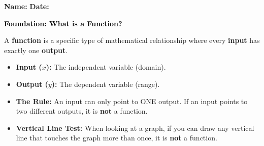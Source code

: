 \documentclass[12pt, letterpaper, fleqn]{article}
\begin{document}
\textbf{Name:} \underline{\hspace{5cm}}
\hfill
\textbf{Date:} \underline{\hspace{3cm}}\\

\begin{tcolorbox}[colback=customteal!20]
    \large\textcolor{black}{\textbf{Foundation: What is a Function?}}
\end{tcolorbox}

\vspace{3mm}

\noindent
A \textbf{function} is a specific type of mathematical relationship where every \textbf{input} has exactly one \textbf{output}. 

\begin{itemize}
    \item \textbf{Input ($x$):} The independent variable (domain).
    \item \textbf{Output ($y$):} The dependent variable (range).
    \item \textbf{The Rule:} An input can only point to ONE output. If an input points to two different outputs, it is \textbf{not} a function.
    \item \textbf{Vertical Line Test:} When looking at a graph, if you can draw any vertical line that touches the graph more than once, it is \textbf{not} a function.
\end{itemize}

\vspace{4mm}
\end{document}
